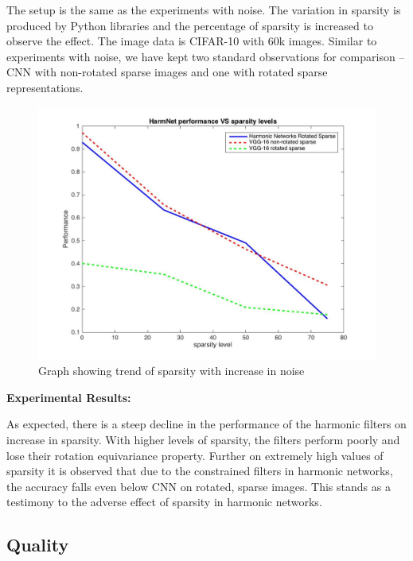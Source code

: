 \documentclass{article}
\begin{document}
The setup is the same as the experiments with noise. The variation in sparsity is produced by Python libraries and the percentage of sparsity is increased to observe the effect. 
The image data is CIFAR-10 with 60k images.
Similar to experiments with noise, we have kept two standard observations for comparison – CNN with non-rotated sparse images and one with rotated sparse representations.

\begin{figure}[t!]
  \includegraphics[width=\linewidth]{vggAndHarmVsSparse.jpg}
  \caption{Graph showing trend of sparsity with increase in noise}
  \label{fig:SparseGraph}
\end{figure}

\textbf{Experimental Results:}

As expected, there is a steep decline in the performance of the harmonic filters on increase in sparsity. With higher levels of sparsity, the filters perform poorly and lose their rotation equivariance property. Further on extremely high values of sparsity it is observed that due to the constrained filters in harmonic networks, the accuracy falls even below CNN on rotated, sparse images. This stands as a testimony to the adverse effect of sparsity in harmonic networks.

\subsection{Quality}
\end{document}
